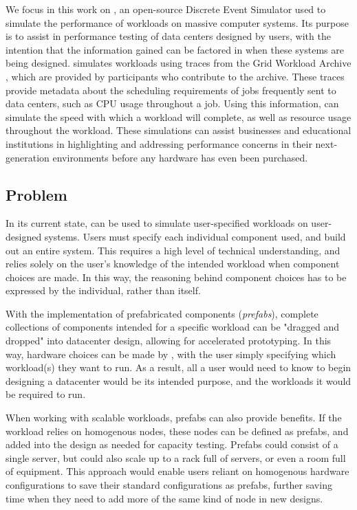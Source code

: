 \documentclass[11pt]{article}
\begin{document}
		We focus in this work on \opendc{}, an open-source Discrete Event Simulator used to simulate the performance of workloads on massive computer systems. 
		Its purpose is to assist in performance testing of data centers designed by users, with the intention that the information gained can be factored in when these systems are being designed. 
		\opendc{} simulates workloads using traces from the Grid Workload Archive \cite{Iosup2008}, which are provided by participants who contribute to the archive. 
		These traces provide metadata about the scheduling requirements of jobs frequently sent to data centers, such as CPU usage throughout a job. 
		Using this information, \opendc{} can simulate the speed with which a workload will complete, as well as resource usage throughout the workload. 
		These simulations can assist businesses and educational institutions in highlighting and addressing performance concerns in their next-generation environments before any hardware has even been purchased.
	
	\subsection{Problem}
		In its current state, \opendc{} can be used to simulate user-specified workloads on user-designed systems. 
		Users must specify each individual component used, and build out an entire system. 
		This requires a high level of technical understanding, and relies solely on the user's knowledge of the intended workload when component choices are made. 
		In this way, the reasoning behind component choices has to be expressed by the individual, rather than \opendc{} itself.  

		With the implementation of prefabricated components (\textit{prefabs}), complete collections of components intended for a specific workload can be "dragged and dropped" into datacenter design, allowing for accelerated prototyping.
		In this way, hardware choices can be made by \opendc{}, with the user simply specifying which workload(s) they want to run.
		As a result, all a user would need to know to begin designing a datacenter would be its intended purpose, and the workloads it would be required to run.

		When working with scalable workloads, prefabs can also provide benefits.
		If the workload relies on homogenous nodes, these nodes can be defined as prefabs, and added into the design as needed for capacity testing.
		Prefabs could consist of a single server, but could also scale up to a rack full of servers, or even a room full of equipment.
		This approach would enable users reliant on homogenous hardware configurations to save their standard configurations as prefabs, further saving time when they need to add more of the same kind of node in new designs.
	
\end{document}
